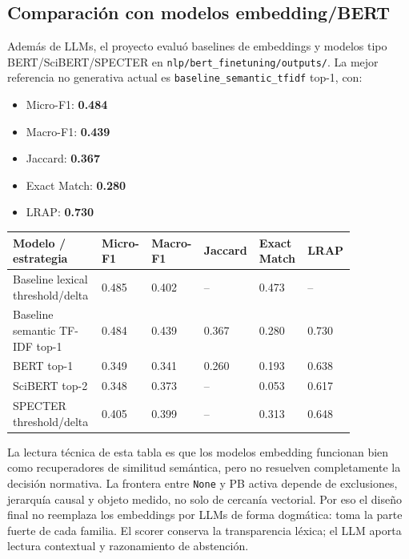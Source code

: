 \subsection{Comparación con modelos embedding/BERT}

Además de LLMs, el proyecto evaluó baselines de embeddings y modelos tipo BERT/SciBERT/SPECTER en \texttt{nlp/bert\_finetuning/outputs/}. La mejor referencia no generativa actual es \texttt{baseline\_semantic\_tfidf} top-1, con:

\begin{itemize}
\item Micro-F1: \textbf{0.484}
\item Macro-F1: \textbf{0.439}
\item Jaccard: \textbf{0.367}
\item Exact Match: \textbf{0.280}
\item LRAP: \textbf{0.730}
\end{itemize}

\begin{center}
\scriptsize
\setlength{\tabcolsep}{4pt}
\renewcommand{\arraystretch}{1.15}
\begin{tabular}{p{0.25\linewidth}p{0.12\linewidth}p{0.12\linewidth}p{0.12\linewidth}p{0.12\linewidth}p{0.12\linewidth}}
\toprule
Modelo / estrategia & Micro-F1 & Macro-F1 & Jaccard & Exact Match & LRAP \\
\midrule
Baseline lexical threshold/delta & 0.485 & 0.402 & -- & 0.473 & -- \\
Baseline semantic TF-IDF top-1 & 0.484 & 0.439 & 0.367 & 0.280 & 0.730 \\
BERT top-1 & 0.349 & 0.341 & 0.260 & 0.193 & 0.638 \\
SciBERT top-2 & 0.348 & 0.373 & -- & 0.053 & 0.617 \\
SPECTER threshold/delta & 0.405 & 0.399 & -- & 0.313 & 0.648 \\
\bottomrule
\end{tabular}
\end{center}

La lectura técnica de esta tabla es que los modelos embedding funcionan bien como recuperadores de similitud semántica, pero no resuelven completamente la decisión normativa. La frontera entre \texttt{None} y PB activa depende de exclusiones, jerarquía causal y objeto medido, no solo de cercanía vectorial. Por eso el diseño final no reemplaza los embeddings por LLMs de forma dogmática: toma la parte fuerte de cada familia. El scorer conserva la transparencia léxica; el LLM aporta lectura contextual y razonamiento de abstención.

